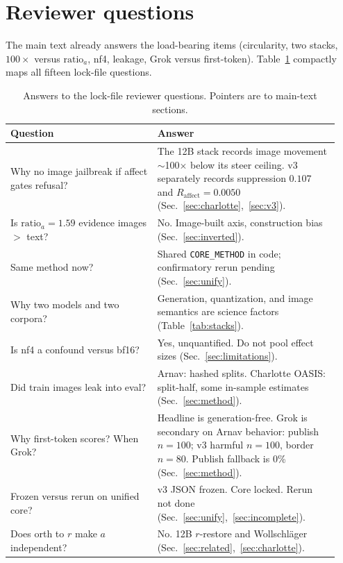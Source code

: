 \documentclass{article}
\begin{document}
\small



\appendix

\section{Reviewer questions}
\label{app:faq}

The main text already answers the load-bearing items (circularity, two stacks, $100\times$ versus $\mathrm{ratio}_a$, nf4, leakage, Grok versus first-token). Table~\ref{tab:faq} compactly maps all fifteen lock-file questions.

\begin{table}[h]
\caption{Answers to the lock-file reviewer questions. Pointers are to main-text sections.}
\label{tab:faq}
\centering
\footnotesize
\begin{tabular}{@{}p{0.42\linewidth}p{0.52\linewidth}@{}}
\toprule
Question & Answer \\
\midrule
Why no image jailbreak if affect gates refusal?
& The 12B stack records image movement $\sim$100$\times$ below its steer ceiling. v3 separately records suppression $0.107$ and $R_{\mathrm{affect}}=0.0050$ (Sec.~\ref{sec:charlotte},~\ref{sec:v3}). \\
Is $\mathrm{ratio}_a=1.59$ evidence images $>$ text?
& No. Image-built axis, construction bias (Sec.~\ref{sec:inverted}). \\
Same method now?
& Shared \texttt{CORE\_METHOD} in code; confirmatory rerun pending (Sec.~\ref{sec:unify}). \\
Why two models and two corpora?
& Generation, quantization, and image semantics are science factors (Table~\ref{tab:stacks}). \\
Is nf4 a confound versus bf16?
& Yes, unquantified. Do not pool effect sizes (Sec.~\ref{sec:limitations}). \\
Did train images leak into eval?
& Arnav: hashed splits. Charlotte OASIS: split-half, some in-sample estimates (Sec.~\ref{sec:method}). \\
Why first-token scores? When Grok?
& Headline is generation-free. Grok is secondary on Arnav behavior: publish $n=100$; v3 harmful $n=100$, border $n=80$. Publish fallback is 0\% (Sec.~\ref{sec:method}). \\
Frozen versus rerun on unified core?
& v3 JSON frozen. Core locked. Rerun not done (Sec.~\ref{sec:unify},~\ref{sec:incomplete}). \\
Does orth to $r$ make $a$ independent?
& No. 12B $r$-restore and Wollschl{\"a}ger (Sec.~\ref{sec:related},~\ref{sec:charlotte}). \\

\end{tabular}
\end{table}
\end{document}
